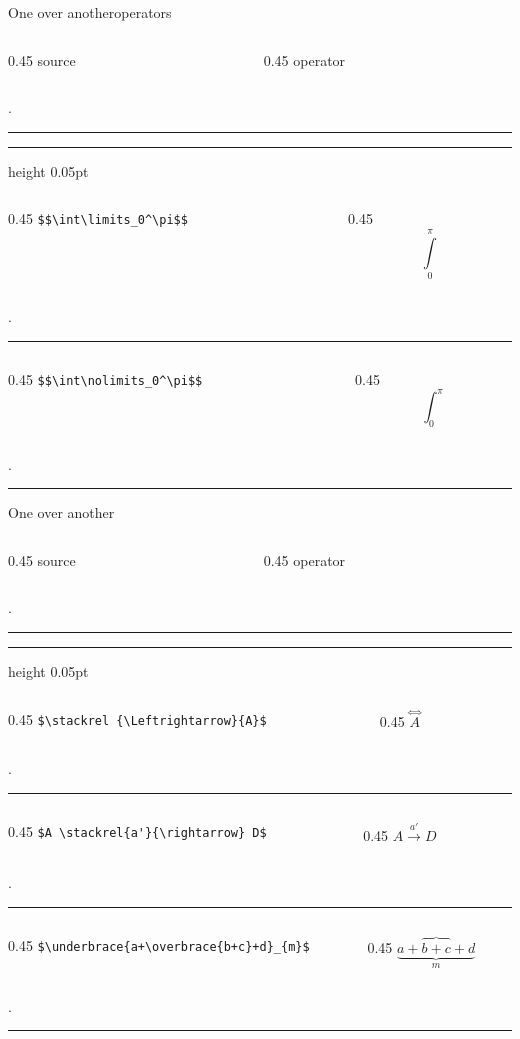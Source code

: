 \begin{frame}[fragile]{One over another}{operators}\relax

\newcommand{\appendTline}[2]{\vspace*{10pt}\begin{columns}
        \begin{column}{0.45\textwidth}
          \hfill #1 
        \end{column}
        \begin{column}{0.45\textwidth}
             \hfill #2\hfill \hfill
        \end{column}
    \end{columns}
    \vphantom.
    \hrule
    }

    \cprotect[mm]\appendTline{\csk source}{\csk operator}
    \hrule height 0.05pt
    \cprotect[mm]\appendTline{\lstinline[basicstyle=\tt\normalsize,]|$$\int\limits_0^\pi$$|}{$$\int\limits_0^\pi$$}
    \cprotect[mm]\appendTline{\lstinline[basicstyle=\tt\normalsize,]|$$\int\nolimits_0^\pi$$|}{$$\int\nolimits_0^\pi$$}

\end{frame}

\begin{frame}[fragile]{One over another}\relax

\newcommand{\appendTline}[2]{\vspace*{10pt}\begin{columns}
        \begin{column}{0.45\textwidth}
          \hfill #1 
        \end{column}
        \begin{column}{0.45\textwidth}
             \hfill #2\hfill \hfill
        \end{column}
    \end{columns}
    \vphantom.
    \hrule
    }

    \cprotect[mm]\appendTline{\csk source}{\csk operator}
    \hrule height 0.05pt
    \cprotect[mm]\appendTline{\lstinline|$\stackrel {\Leftrightarrow}{A}$|}{$\stackrel {\Leftrightarrow}{A}$}
    \cprotect[mm]\appendTline{\lstinline|$A \stackrel{a'}{\rightarrow} D$|}{$A \stackrel{a'}{\rightarrow} D$}
    \cprotect[mm]\appendTline{\lstinline|$\underbrace{a+\overbrace{b+c}+d}_{m}$|}{$\underbrace{a+\overbrace{b+c}+d}_{m}$}
    
\end{frame}
